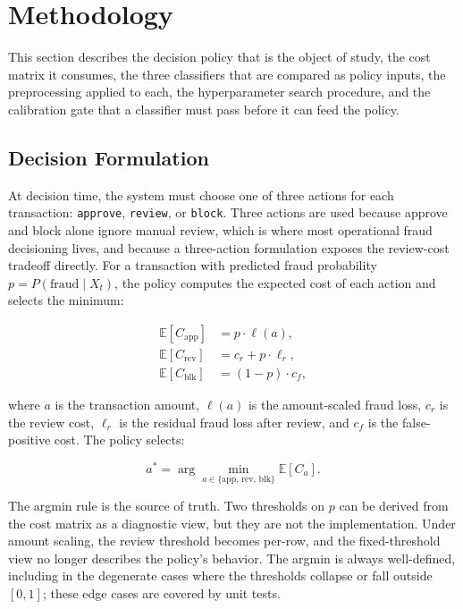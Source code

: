 \documentclass[conference]{IEEEtran}
\begin{document}
\section{Methodology}

This section describes the decision policy that is the object of study,
the cost matrix it consumes, the three classifiers that are compared as
policy inputs, the preprocessing applied to each, the hyperparameter search
procedure, and the calibration gate that a classifier must pass before it
can feed the policy.

\subsection{Decision Formulation}

At decision time, the system must choose one of three actions for each
transaction: \texttt{approve}, \texttt{review}, or \texttt{block}. Three
actions are used because approve and block alone ignore manual review,
which is where most operational fraud decisioning lives, and because a
three-action formulation exposes the review-cost tradeoff directly. For a
transaction with predicted fraud probability $p = P(\text{fraud} \mid X_t)$,
the policy computes the expected cost of each action and selects the
minimum:

\begin{equation}
\begin{aligned}
\mathbb{E}[C_{\text{app}}] &= p \cdot \ell(a), \\
\mathbb{E}[C_{\text{rev}}] &= c_r + p \cdot \ell_r, \\
\mathbb{E}[C_{\text{blk}}] &= (1 - p) \cdot c_f,
\end{aligned}
\end{equation}

where $a$ is the transaction amount, $\ell(a)$ is the amount-scaled fraud
loss, $c_r$ is the review cost, $\ell_r$ is the residual fraud loss after
review, and $c_f$ is the false-positive cost. The policy selects:

\begin{equation}
a^{*} = \arg\min_{a \in \{\text{app},\,\text{rev},\,\text{blk}\}} \mathbb{E}[C_a].
\end{equation}

The argmin rule is the source of truth. Two thresholds on $p$ can be
derived from the cost matrix as a diagnostic view, but they are not the
implementation. Under amount scaling, the review threshold becomes per-row,
and the fixed-threshold view no longer describes the policy's behavior. The
argmin is always well-defined, including in the degenerate cases where the
thresholds collapse or fall outside $[0,1]$; these edge cases are covered
by unit tests.
\end{document}
